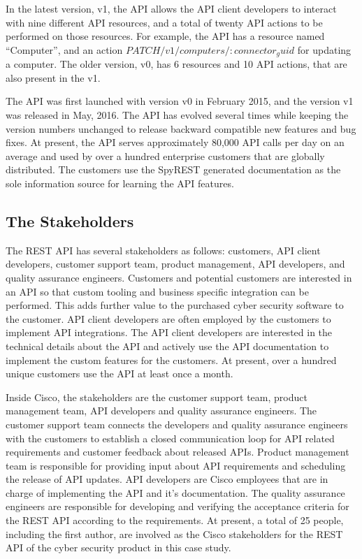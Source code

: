 \documentclass[10pt, conference]{IEEEtran}
\begin{document}
In the latest version, v1, the API allows the API client developers to interact with nine different API resources, and a total of twenty API actions to be performed on those resources. For example, the API has a resource named ``Computer'', and an action $PATCH /v1/computers/{:connector_guid}$ for updating a computer. The older version, v0, has 6 resources and 10 API actions, that are also present in the v1.

The API was first launched with version v0 in February 2015, and the version v1 was released in May, 2016. The API has evolved several times while keeping the version numbers unchanged to release backward compatible new features and bug fixes. At present, the API serves approximately 80,000 API calls per day on an average and used by over a hundred enterprise customers that are globally distributed. The customers use the SpyREST generated documentation as the sole information source for learning the API features.

\subsection{The Stakeholders} %
The REST API has several stakeholders as follows: customers, API client developers, customer support team, product management, API developers, and quality assurance engineers. Customers and potential customers are interested in an API so that custom tooling and business specific integration can be performed. This adds further value to the purchased cyber security software to the customer. API client developers are often employed by the customers to implement API integrations. The API client developers are interested in the technical details about the API and actively use the API documentation to implement the custom features for the customers. At present, over a hundred unique customers use the API at least once a month.

Inside Cisco, the stakeholders are the customer support team, product management team, API developers and quality assurance engineers. The customer support team connects the developers and quality assurance engineers with the customers to establish a closed communication loop for API related requirements and customer feedback about released APIs. Product management team is responsible for providing input about API requirements and scheduling the release of API updates. API developers are Cisco employees that are in charge of implementing the API and it's documentation. The quality assurance engineers are responsible for developing and verifying the acceptance criteria for the REST API according to the requirements. At present, a total of 25 people, including the first author, are involved as the Cisco stakeholders for the REST API of the cyber security product in this case study.
\end{document}
